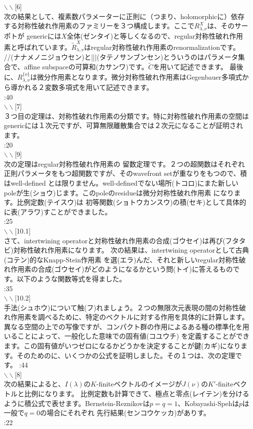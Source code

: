 \documentclass[11pt]{article} %
\newcommand{\slide}[1]{\noindent$\backslash\backslash$[#1]\\}
\newcommand{\mytime}[1]{\noindent #1\\}
\newcommand{\kana}[2]{#1{\scriptsize (#2)}}
\newcommand{\J}{$J(\nu)$}
\newcommand{\I}{$I(\lambda)$}
\newcommand{\doubt}[1]{\fbox{#1}}
\begin{document}
\slide{6}
次の結果として、複素数パラメーターに正則に（つまり、holomorphicに）依存する対称性破れ作用素のファミリーを３つ構成します。ここで$R_{\lambda,\nu}^X$は、そのサーポトが
genericには$X$\kana{全体}{ゼンタイ}と等しくなるので、regular対称性破れ作用素と呼ばれています。$\tilde{R}_{\lambda,\nu}^X$はregular対称性破れ作用素のrenormalizationです。
\kana{//}{ナナメノニジョウセン}と\kana{|||}{タテノサンブンセン}とういうのはパラメータ集合で、affine subspaceの\kana{可算和}{カサンワ}です。$\tilde{C}$を用いて記述できます。
最後に、$R^{\{o\}}_{\lambda,\nu}$は微分作用素となります。微分対称性破れ作用素はGegenbauer多項式から導かれる２変数多項式を用いて記述できます。\\
\mytime{0:40}

\slide{7}
３つ目の定理は、対称性破れ作用素の分類です。特に対称性破れ作用素の空間はgenericには１次元ですが、可算無限離散集合では２次元になることが証明されます。\\
\mytime{0:20}

\slide{9}
次の定理はregular対称性破れ作用素の
留数定理です。２つの超関数はそれぞれ正則パラメータをもつ超関数ですが、そのwavefront setが重なりをもつので、積はwell-defined
とは限りません。well-definedでない\kana{場所}{トコロ}にまた新しいpoleが\kana{生}{ショウ}じます。このpoleのresidueは微分対称性破れ作用素
になります。比例\kana{定数}{テイスウ}は
\kana{初等関数}{ショトウカンスウ}の\kana{積}{セキ}として具体的に\kana{表}{アラワ}すことができました。\\
\mytime{0:25}

\slide{10.1}
さて、intertwining operatorと対称性破れ作用素の\kana{合成}{ゴウセイ}は\kana{再び}{フタタビ}対称性破れ作用素になります。
次の結果は、intertwining operatorとして\kana{古典}{コテン}的なKnapp-Stein作用素
を\kana{選}{エラ}んだ\doubt{とき}、それと新しいregular対称性破れ作用素の\kana{合成}{ゴウセイ}がどのようになるかという\kana{問}{トイ}に答えるものです。以下のような関数等式を得ました。\\
\mytime{0:35}

\slide{10.2}
\kana{手法}{シュホウ}について\doubt{少し}\kana{触}{フ}れましょう。２つの無限次元表現の間の対称性破れ作用素を調べるために、特定のベクトルに対する作用を具体的に計算します。異なる空間の上での写像ですが、コンパクト群の作用によるある種の標準化を用いることによって、一般化した意味での\kana{固有値}{コユウチ}
を定義することができます。この固有値がいつゼロになるかどうかを決定することが\kana{鍵}{カギ}になります。そのためのに、いくつかの公式を証明しました。その１つは、次の定理です。
\mytime{0:44}

\slide{8}
次の結果によると、\I の$K$-finiteベクトルのイメージが\J の$K'$-finiteベクトルと比例になります。
比例定数も計算できて、極点と\kana{零点}{レイテン}を分けるように積公式で表せます。Bernstein-Reznikovは$p=q=1$、Kobayashi-Spehは$p$は一般で$q=0$の場合にそれぞれ
\kana{先行結果}{センコウケッカ}がありす。\\
\mytime{0:22}
\end{document}

